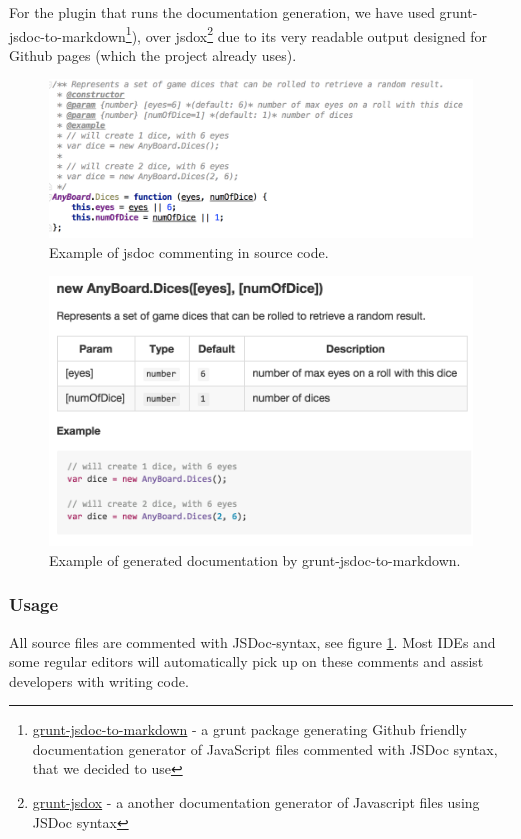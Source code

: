 For the plugin that runs the documentation generation, we have used grunt-jsdoc-to-markdown\footnote{\href{https://www.npmjs.com/package/grunt-jsdoc-to-markdown}{grunt-jsdoc-to-markdown} - a grunt package generating Github friendly documentation generator of JavaScript files commented with JSDoc syntax, that we decided to use}), over jsdox\footnote{\href{https://www.npmjs.com/package/grunt-jsdox}{grunt-jsdox} - a another documentation generator of Javascript files using JSDoc syntax} due to its very readable output designed for Github pages (which the project already uses).

\begin{figure}[ht]
\includegraphics[width=12cm]{img/jsdoc-example}
\centering
\caption{Example of jsdoc commenting in source code.}
\label{fig:jsdoc_example}
\end{figure}

\begin{figure}[ht]
\includegraphics[width=12cm]{img/jsdoc-result}
\centering
\caption{Example of generated documentation by grunt-jsdoc-to-markdown.}
\label{fig:jsdoc_result}
\end{figure}

\subsubsection{Usage}
All source files are commented with JSDoc-syntax, see figure \ref{fig:jsdoc_example}. Most IDEs and some regular editors will automatically pick up on these comments and assist developers with writing code.

